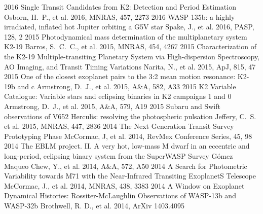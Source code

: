 \documentclass[print]{friggeri-cv} %
\begin{document}
\begin{entrylist}
\entry
{\small 2016}
{\normalfont \small Single Transit Candidates from K2: Detection and Period Estimation}
{}
{\small Osborn, H.~P., et al. 2016, MNRAS, 457, 2273}
\entry
{\small 2016}
{\normalfont \small WASP-135b: a highly irradiated, inflated hot Jupiter orbiting a G5V star}
{}
{\small Spake, J., et al. 2016, PASP, 128, 2}
\entry
{\small 2015}
{\normalfont \small Photodynamical mass determination of the multiplanetary system K2-19}
{}
{\small Barros, S.~C.~C., et al. 2015, MNRAS, 454, 4267}
\entry
{\small 2015}
{\normalfont \small Characterization of the K2-19 Multiple-transiting Planetary System via High-dispersion Spectroscopy, AO Imaging, and Transit Timing Variations}
{}
{\small Narita, N., et al. 2015, ApJ, 815, 47}
\entry
{\small 2015}
{\normalfont \small One of the closest exoplanet pairs to the 3:2 mean motion resonance: K2-19b and c}
{}
{\small Armstrong, D.~J., et al. 2015, A\&A, 582, A33}
\entry
{\small 2015}
{\normalfont \small K2 Variable Catalogue: Variable stars and eclipsing binaries in K2 campaigns 1 and 0}
{}
{\small Armstrong, D.~J., et al. 2015, A\&A, 579, A19}
\entry
{\small 2015}
{\normalfont \small Subaru and Swift observations of V652 Herculis: resolving the photospheric pulsation}
{}
{\small Jeffery, C.~S. et al. 2015, MNRAS, 447, 2836}
\entry
{\small 2014}
{\small The Next Generation Transit Survey Prototyping Phase}
{}
{\small McCormac, J, et al. 2014, RevMex Conference Series, 45, 98}
\entry
{\small 2014}
{\normalfont \small The EBLM project. II. A very hot, low-mass M dwarf in an eccentric and long-period, eclipsing binary system from the SuperWASP Survey}
{}
{\small G{\'o}mez Maqueo Chew, Y., et al. 2014, A\&A, 572, A50}
\entry
{\small 2014}
{\small A Search for Photometric Variability towards M71 with the Near-Infrared Transiting ExoplanetS Telescope}
{}
{\small McCormac, J., et al. 2014, MNRAS, 438, 3383}
\entry
{\small 2014}
{\normalfont \small A Window on Exoplanet Dynamical Histories: Rossiter-McLaughlin Observations of WASP-13b and WASP-32b}
{}
{\small Brothwell, R. D., et al. 2014, ArXiv 1403.4095}

\end{entrylist}
\end{document}
